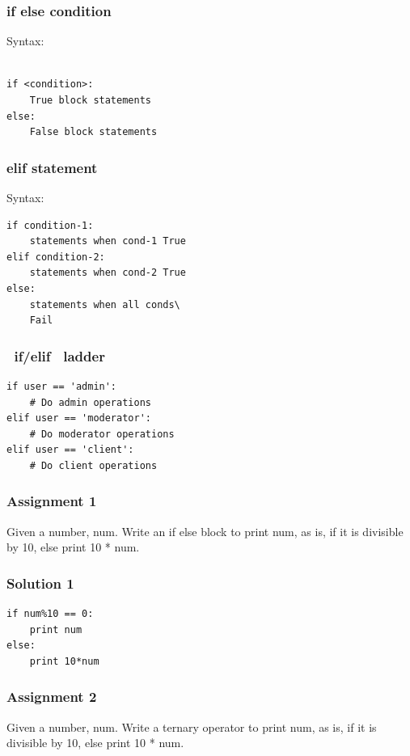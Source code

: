 \documentclass[17pt]{beamer}
\begin{document}
\begin{frame}[fragile]
\frametitle{if else condition}
Syntax:
\lstset{language=Python}
\begin{lstlisting}

if <condition>:
    True block statements
else:
    False block statements
\end{lstlisting}
\end{frame}
\begin{frame}[fragile]
\frametitle{elif statement}
Syntax:
\lstset{language=Python}
\begin{lstlisting}
if condition-1:
    statements when cond-1 True
elif condition-2:
    statements when cond-2 True
else:
    statements when all conds\ 
    Fail
\end{lstlisting}
\end{frame}
\begin{frame}[fragile]
\frametitle{~if/elif~ ladder}

\lstset{language=Python}
\begin{lstlisting}
if user == 'admin':
    # Do admin operations
elif user == 'moderator':
    # Do moderator operations
elif user == 'client':
    # Do client operations
\end{lstlisting}
\end{frame}
\begin{frame}
\frametitle{Assignment 1}
\label{sec-5}

  Given a number, num. Write an if else block to print num, as is, if
  it is divisible by 10, else print 10 * num.
\end{frame}
\begin{frame}[fragile]
\frametitle{Solution 1}
\label{sec-6}

\lstset{language=Python}
\begin{lstlisting}
if num%10 == 0: 
    print num   
else:           
    print 10*num
\end{lstlisting}
\end{frame}
\begin{frame}
\frametitle{Assignment 2}
\label{sec-7}

  Given a number, num. Write a ternary operator to print num, as is,
  if it is divisible by 10, else print 10 * num.
\end{frame}
\end{document}
